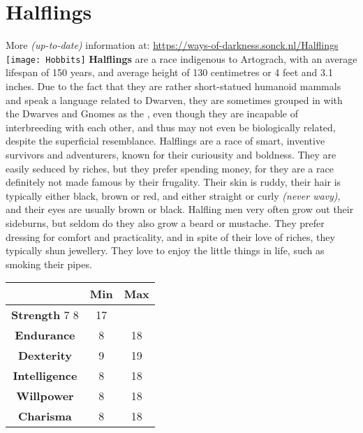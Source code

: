 \documentclass[openany,10pt,a4paper]{book}
\begin{document}
\section{Halflings}
More \textit{(up-to-date)} information at: \url{https://ways-of-darkness.sonck.nl/Halflings}\newline
\texttt{[image: Hobbits]}\newline
\textbf{Halflings} are a race indigenous to Artograch, with an average lifespan of 150 years, and average height of 130 centimetres or 4 feet and 3.1 inches. Due to the fact that they are rather short-statued humanoid mammals and speak a language related to Dwarven, they are sometimes grouped in with the Dwarves and Gnomes as the , even though they are incapable of interbreeding with each other, and thus may not even be biologically related, despite the superficial resemblance.\newline
Halflings are a race of smart, inventive survivors and adventurers, known for their curiousity and boldness. They are easily seduced by riches, but they prefer spending money, for they are a race definitely not made famous by their frugality. Their skin is ruddy, their hair is typically either black, brown or red, and either straight or curly \textit{(never wavy)}, and their eyes are usually brown or black. Halfling men very often grow out their sideburns, but seldom do they also grow a beard or mustache. They prefer dressing for comfort and practicality, and in spite of their love of riches, they typically shun jewellery. They love to enjoy the little things in life, such as smoking their pipes.\newline
\begin{tabular}{|c|c|c|}
\hline
 & \textbf{Min} & \textbf{Max} \\ \hline
\textbf{Strength} 7 8 & 17 \\ \hline
\textbf{Endurance} & 8 & 18 \\ \hline
\textbf{Dexterity} & 9 & 19 \\ \hline
\textbf{Intelligence} & 8 & 18 \\ \hline
\textbf{Willpower} & 8 & 18 \\ \hline
\textbf{Charisma} & 8 & 18 \\ \hline
\end{tabular}\newline
{} \newpage
\end{document}
